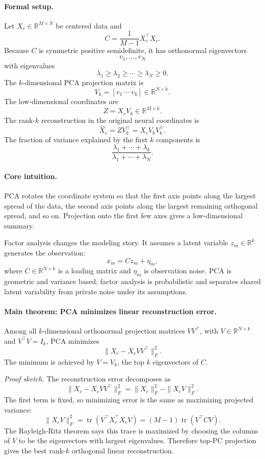 \paragraph{Formal setup.}
Let \(X_c\in\mathbb R^{M\times N}\) be centered data and
\[
C=\frac{1}{M-1}X_c^\top X_c.
\]
Because \(C\) is symmetric positive semidefinite, it has orthonormal eigenvectors
\[
v_1,\ldots,v_N
\]
with eigenvalues
\[
\lambda_1\geq \lambda_2\geq\cdots\geq \lambda_N\geq0.
\]
The \(k\)-dimensional PCA projection matrix is
\[
V_k=[v_1\ \cdots\ v_k]\in\mathbb R^{N\times k}.
\]
The low-dimensional coordinates are
\[
\boxed{
Z=X_cV_k\in\mathbb R^{M\times k}.
}
\]
The rank-\(k\) reconstruction in the original neural coordinates is
\[
\widehat X_c=ZV_k^\top=X_cV_kV_k^\top.
\]
The fraction of variance explained by the first \(k\) components is
\[
\boxed{
\frac{\lambda_1+\cdots+\lambda_k}{\lambda_1+\cdots+\lambda_N}.
}
\]

\paragraph{Core intuition.}
PCA rotates the coordinate system so that the first axis points along the largest spread of the data, the second axis points along the largest remaining orthogonal spread, and so on. Projection onto the first few axes gives a low-dimensional summary.

Factor analysis changes the modeling story. It assumes a latent variable \(z_m\in\mathbb R^k\) generates the observation:
\[
x_m=Cz_m+\eta_m,
\]
where \(C\in\mathbb R^{N\times k}\) is a loading matrix and \(\eta_m\) is observation noise. PCA is geometric and variance based; factor analysis is probabilistic and separates shared latent variability from private noise under its assumptions.

\paragraph{Main theorem: PCA minimizes linear reconstruction error.}
Among all \(k\)-dimensional orthonormal projection matrices \(VV^\top\), with \(V\in\mathbb R^{N\times k}\) and \(V^\top V=I_k\), PCA minimizes
\[
\|X_c-X_cVV^\top\|_F^2.
\]
The minimum is achieved by \(V=V_k\), the top \(k\) eigenvectors of \(C\).

\emph{Proof sketch.}
The reconstruction error decomposes as
\[
\|X_c-X_cVV^\top\|_F^2
=\|X_c\|_F^2-\|X_cV\|_F^2.
\]
The first term is fixed, so minimizing error is the same as maximizing projected variance:
\[
\|X_cV\|_F^2
=\operatorname{tr}(V^\top X_c^\top X_c V)
=(M-1)\operatorname{tr}(V^\top C V).
\]
The Rayleigh-Ritz theorem says this trace is maximized by choosing the columns of \(V\) to be the eigenvectors with largest eigenvalues. Therefore top-PC projection gives the best rank-\(k\) orthogonal linear reconstruction.

